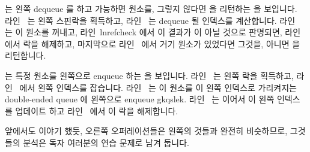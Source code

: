 \begin{fcvref}
 는 왼쪽 dequeue 를 하고 가능하면 원소를, 그렇지 않다면
 을 리턴하는  을 보입니다.
라인~ 는 왼쪽 스핀락을 획득하고, 라인~ 는 dequeue 될
인덱스를 계산합니다.
라인~ 는 이 원소를 꺼내고, 라인~lnref{check} 에서 이 결과가
 이 아닐 것으로 판명되면, 라인~ 에서 락을 해제하고,
마지막으로 라인~ 에서 거기 원소가 있었다면 그것을, 아니면
 을 리턴합니다.
\end{fcvref}

\begin{fcvref}
 는 특정 원소를 왼쪽으로 enqueue 하는  을
보입니다.
라인~ 는 왼쪽 락을 획득하고, 라인~ 에서 왼쪽 인덱스를
잡습니다.
라인~ 는 이 원소를 이 왼쪽 인덱스로 가리켜지는 double-ended queue
에 왼쪽으로 enqueue gkqslek.
라인~ 는 이어서 이 왼쪽 인덱스를 업데이트 하고 라인~
에서 이 락을 해제합니다.
\end{fcvref}

앞에서도 이야기 했듯, 오른쪽 오퍼레이션들은 왼쪽의 것들과 완전히 비슷하므로,
그것들의 분석은 독자 여러분의 연습 문제로 남겨 둡니다.


